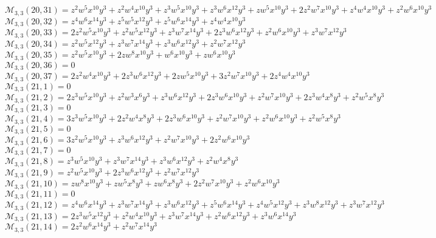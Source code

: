 \documentclass[12pt]{memoireuqam1.3}
\begin{document}
$\mathcal{M}_{3,3}(20,31)=z^2w^5x^{10}y^3+z^2w^4x^{10}y^3+z^3w^5x^{10}y^3+z^3w^6x^{12}y^3+zw^5x^{10}y^3+2z^2w^7x^{10}y^3+z^4w^4x^{10}y^3+z^2w^6x^{10}y^3$\\
$\mathcal{M}_{3,3}(20,32)=z^4w^6x^{14}y^3+z^5w^5x^{12}y^3+z^5w^6x^{14}y^3+z^4w^4x^{10}y^3$\\
$\mathcal{M}_{3,3}(20,33)=2z^2w^5x^{10}y^3+z^2w^5x^{12}y^3+z^3w^7x^{14}y^3+2z^3w^6x^{12}y^3+z^2w^6x^{10}y^3+z^3w^7x^{12}y^3$\\
$\mathcal{M}_{3,3}(20,34)=z^2w^5x^{12}y^3+z^3w^7x^{14}y^3+z^3w^6x^{12}y^3+z^2w^7x^{12}y^3$\\
$\mathcal{M}_{3,3}(20,35)=z^2w^5x^{10}y^3+2zw^8x^{10}y^3+w^6x^{10}y^3+zw^6x^{10}y^3$\\
$\mathcal{M}_{3,3}(20,36)=0$\\
$\mathcal{M}_{3,3}(20,37)=2z^2w^4x^{10}y^3+2z^3w^6x^{12}y^3+2zw^5x^{10}y^3+3z^2w^7x^{10}y^3+2z^4w^4x^{10}y^3$\\
$\mathcal{M}_{3,3}(21,1)=0$\\
$\mathcal{M}_{3,3}(21,2)=2z^3w^5x^{10}y^3+z^2w^3x^6y^3+z^3w^6x^{12}y^3+2z^3w^6x^{10}y^3+z^2w^7x^{10}y^3+2z^3w^4x^8y^3+z^2w^5x^8y^3$\\
$\mathcal{M}_{3,3}(21,3)=0$\\
$\mathcal{M}_{3,3}(21,4)=3z^3w^5x^{10}y^3+2z^2w^4x^8y^3+2z^3w^6x^{10}y^3+z^2w^7x^{10}y^3+z^2w^6x^{10}y^3+z^2w^5x^8y^3$\\
$\mathcal{M}_{3,3}(21,5)=0$\\
$\mathcal{M}_{3,3}(21,6)=3z^2w^5x^{10}y^3+z^3w^6x^{12}y^3+z^2w^7x^{10}y^3+2z^2w^6x^{10}y^3$\\
$\mathcal{M}_{3,3}(21,7)=0$\\
$\mathcal{M}_{3,3}(21,8)=z^3w^5x^{10}y^3+z^3w^7x^{14}y^3+z^3w^6x^{12}y^3+z^2w^4x^8y^3$\\
$\mathcal{M}_{3,3}(21,9)=z^2w^5x^{10}y^3+2z^3w^6x^{12}y^3+z^2w^7x^{12}y^3$\\
$\mathcal{M}_{3,3}(21,10)=zw^8x^{10}y^3+zw^5x^8y^3+zw^6x^8y^3+2z^2w^7x^{10}y^3+z^2w^6x^{10}y^3$\\
$\mathcal{M}_{3,3}(21,11)=0$\\
$\mathcal{M}_{3,3}(21,12)=z^4w^6x^{14}y^3+z^3w^7x^{14}y^3+z^3w^6x^{12}y^3+z^5w^6x^{14}y^3+z^4w^5x^{12}y^3+z^3w^8x^{12}y^3+z^3w^7x^{12}y^3$\\
$\mathcal{M}_{3,3}(21,13)=2z^3w^5x^{12}y^3+z^2w^4x^{10}y^3+z^3w^7x^{14}y^3+z^2w^6x^{12}y^3+z^3w^6x^{14}y^3$\\
$\mathcal{M}_{3,3}(21,14)=2z^2w^6x^{14}y^3+z^2w^7x^{14}y^3$\\
\end{document}
